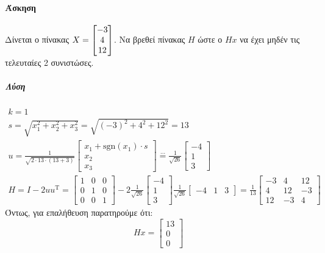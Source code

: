 \documentclass[11pt,a4paper,notitlepage,fleqn,final]{article}
\begin{document}
\paragraph{Άσκηση}
Δίνεται ο πίνακας \( \mathlarger{X=\left[\begin{matrix}
	-3\\4\\12 \end{matrix}
	\right]} \). Να βρεθεί πίνακας \( H \) ώστε ο \( Hx \) να έχει μηδέν
τις τελευταίες 2 συνιστώσες.
\subparagraph{Λύση}
\begin{gather*}
	k=1 \\ s=\sqrt{x_1^2+x_2^2+x_3^2} = \sqrt{(-3)^2+4^2+12^2} = 13
	\\ u = \frac{1}{\sqrt{2\cdot 13\cdot (13+3)}}\left[
	\begin{matrix}
	x_1+\mathrm{sgn}(x_1)\cdot s\\ x_2 \\ x_3
	\end{matrix}\right] \overset{\cdots}{=} \frac{1}{\sqrt{26}} \left[
	\begin{matrix}
	-4\\1\\3
	\end{matrix}\right] \\
	H = I-2uu^{\mathrm T} = \left[\begin{matrix}
	1&0&0\\0&1&0\\0&0&1
	\end{matrix}\right] - 2\frac{1}{\sqrt{26}}\left[\begin{matrix}
	-4\\1\\3
	\end{matrix}\right]\frac{1}{\sqrt{26}}\left[\begin{matrix}
	-4&1&3
	\end{matrix}\right]
	= \frac{1}{13}\left[\begin{matrix}
	-3&4&12\\4&12&-3\\12&-3&4
	\end{matrix}\right]
\end{gather*}
Όντως, για επαλήθευση παρατηρούμε ότι:
\[
Hx = \left[\begin{matrix}
13\\0\\0
\end{matrix}\right]
\]
\end{document}
